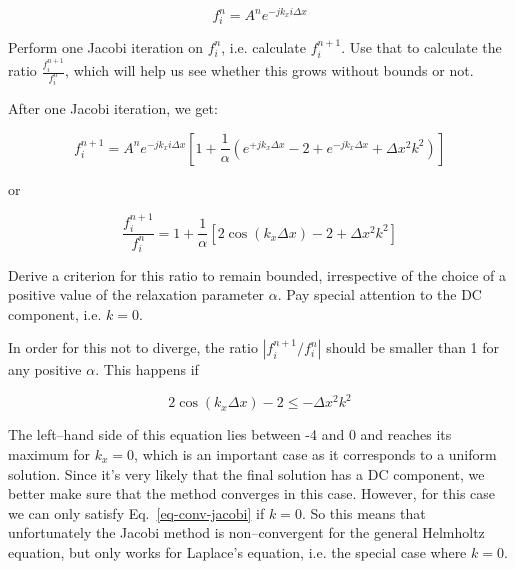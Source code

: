 \begin{equation}
f_i^n = A^n e^{-j k_x i \Delta x}
\end{equation} 

\begin{cue}
Perform one Jacobi iteration on $f_i^n$, i.e. calculate $f_i^{n+1}$. Use that to calculate the ratio $\frac{f_i^{n+1}}{f_i^{n}}$, which will help us see whether this grows without bounds or not.  
\end{cue}

After one Jacobi iteration, we get:

\begin{equation}
f_i^{n+1} = A^n e^{-j k_x i \Delta x} \left[{ 1 + \frac{1}{\alpha}\left(e^{+ j k_x  \Delta x} - 2+  e^{-j k_x  \Delta x} + \Delta x^2 k^2\right)}\right]
\end{equation} 

or

\begin{equation}
\frac{f_i^{n+1}}{f_i^{n}} =  1 + \frac{1}{\alpha}\left[2 \cos ( k_x  \Delta x) - 2 + \Delta x^2 k^2\right]
\end{equation} 

\begin{cue}
Derive a criterion for this ratio to remain bounded, irrespective of the choice of a positive value of the relaxation parameter $\alpha$. Pay special attention to the DC component, i.e. $k=0$. 
\end{cue}

In order for this not to diverge, the ratio  $|f_i^{n+1} / f_i^{n}|$ should be smaller than 1 for any positive $\alpha$. This happens if

\begin{equation}
2 \cos ( k_x  \Delta x) - 2 \le - \Delta x^2 k^2 \label{eq-conv-jacobi}
\end{equation} 

The left--hand side of this equation lies between -4 and 0 and reaches its maximum for $k_x=0$, which is an important case as it corresponds to a uniform solution. Since it's very likely that the final solution has a DC component, we better make sure that the method converges in this case. However, for this case we can only satisfy Eq.~\ref{eq-conv-jacobi} if $k=0$. So this means that unfortunately the Jacobi method is non--convergent for the general Helmholtz equation, but only works for Laplace's equation, i.e. the special case where $k=0$.

\pagebreak

